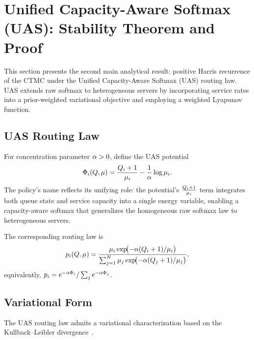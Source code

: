 
\section{Unified Capacity-Aware Softmax (UAS): Stability Theorem and Proof}
\label{sec:uas_theorem}

This section presents the second main analytical result: positive Harris recurrence of the CTMC under the Unified Capacity-Aware Softmax (UAS) routing law. UAS extends raw softmax to heterogeneous servers by incorporating service rates into a prior-weighted variational objective and employing a weighted Lyapunov function.

\subsection{UAS Routing Law}
\label{sec:uas:routing}

\begin{definition}
\label{def:uas_potential}
For concentration parameter $\alpha > 0$, define the UAS potential
\begin{equation}
\label{eq:uas_potential}
\Phi_{i}(Q, \mu) = \frac{Q_{i}+1}{\mu_i} - \frac{1}{\alpha}\log \mu_i.
\end{equation}
The policy's name reflects its unifying role: the potential's $\frac{Q_{i}+1}{\mu_i}$ term integrates both queue state and service capacity into a single energy variable, enabling a capacity-aware softmax that generalizes the homogeneous raw softmax law to heterogeneous servers.
\end{definition}

The corresponding routing law is
\begin{equation}
\label{eq:uas_law}
p_{i}(Q, \mu) = \frac{\mu_i \exp\!\bigl(-\alpha (Q_{i}+1)/\mu_i\bigr)}{\sum_{j=1}^{N} \mu_j \exp\!\bigl(-\alpha (Q_{j}+1)/\mu_j\bigr)},
\end{equation}
equivalently, $p_{i} = e^{-\alpha \Phi_{i}} / \sum_j e^{-\alpha \Phi_{j}}$.

\subsection{Variational Form}
\label{sec:uas:variational}

The UAS routing law admits a variational characterization based on the Kullback--Leibler divergence~\cite{cover2006elements}.

